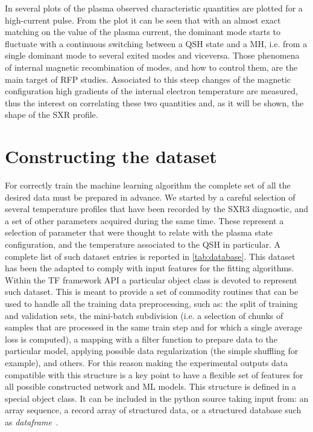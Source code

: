 In \Figure{\ref{fig:rfx_shot_22069}} several plots of the plasma observed characteristic quantities are plotted for a high-current pulse. From the plot it can be seen that with an almost exact matching on the value of the plasma current, the dominant mode starts to fluctuate with a continuous switching between a QSH state and a MH, i.e. from a single dominant mode to several exited modes and viceversa. Those phenomena of internal magnetic recombination of modes, and how to control them, are the main target of RFP studies. 
Associated to this steep changes of the magnetic configuration high gradients of the internal electron temperature are measured, thus the interest on correlating these two quantities and, as it will be shown, the shape of the SXR profile. 


                                   
\section{Constructing the dataset} %
\label{section:SXR_dataset}

For correctly train the machine learning algorithm the complete set of all the desired data must be prepared in advance. We started by a careful selection of several temperature profiles that have been recorded by the SXR3 diagnostic, and a set of other parameters acquired during the same time. %
These represent a selection of parameter that were thought to relate with the plasma state configuration, and the temperature associated to the QSH in particular. A complete list of such dataset entries is reported in \ref{tab:database}. This dataset has been the adapted to comply with \Tensorflow input features for the fitting algorithms. Within the \acs{TF} framework API a particular object class is devoted to represent such dataset. This is meant to provide a set of commodity routines that can be used to handle all the training data preprocessing, such as: the split of training and validation sets, the mini-batch subdivision (i.e. a selection of chunks of samples that are processed in the same train step and for which a single average loss is computed), a mapping with a filter function to prepare data to the particular model, applying possible data regularization (the simple shuffling for example), and others.
For this reason making the experimental outputs data compatible with this structure is a key point to have a flexible set of features for all possible constructed network and ML models. 
This structure is defined in a special \TF object class. It can be included in the python source taking input from: an array sequence, a record array of structured data, or a structured database such as \Pandas \textit{dataframe}~\cite{mckinney-proc-scipy-2010}.

